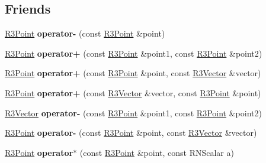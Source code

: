 \subsection*{Friends}
\begin{DoxyCompactItemize}
\item 
\hyperlink{class_r3_point}{R3\+Point} {\bfseries operator-\/} (const \hyperlink{class_r3_point}{R3\+Point} \&point)\hypertarget{class_r3_point_a2b9b2cd86f7ab7e0df974d89ad0c0f15}{}\label{class_r3_point_a2b9b2cd86f7ab7e0df974d89ad0c0f15}

\item 
\hyperlink{class_r3_point}{R3\+Point} {\bfseries operator+} (const \hyperlink{class_r3_point}{R3\+Point} \&point1, const \hyperlink{class_r3_point}{R3\+Point} \&point2)\hypertarget{class_r3_point_aca79abb3dc284337df28b0a0b47b4d4a}{}\label{class_r3_point_aca79abb3dc284337df28b0a0b47b4d4a}

\item 
\hyperlink{class_r3_point}{R3\+Point} {\bfseries operator+} (const \hyperlink{class_r3_point}{R3\+Point} \&point, const \hyperlink{class_r3_vector}{R3\+Vector} \&vector)\hypertarget{class_r3_point_a395bf315cbac0a603151eb78eee9b2fa}{}\label{class_r3_point_a395bf315cbac0a603151eb78eee9b2fa}

\item 
\hyperlink{class_r3_point}{R3\+Point} {\bfseries operator+} (const \hyperlink{class_r3_vector}{R3\+Vector} \&vector, const \hyperlink{class_r3_point}{R3\+Point} \&point)\hypertarget{class_r3_point_a849673eaf1e2a90cae0afdc9d3d0e0b4}{}\label{class_r3_point_a849673eaf1e2a90cae0afdc9d3d0e0b4}

\item 
\hyperlink{class_r3_vector}{R3\+Vector} {\bfseries operator-\/} (const \hyperlink{class_r3_point}{R3\+Point} \&point1, const \hyperlink{class_r3_point}{R3\+Point} \&point2)\hypertarget{class_r3_point_a5c534d1f3962c2e70d7be72b36d5ea03}{}\label{class_r3_point_a5c534d1f3962c2e70d7be72b36d5ea03}

\item 
\hyperlink{class_r3_point}{R3\+Point} {\bfseries operator-\/} (const \hyperlink{class_r3_point}{R3\+Point} \&point, const \hyperlink{class_r3_vector}{R3\+Vector} \&vector)\hypertarget{class_r3_point_a10c15f23f6ad0fb37ba8e8a0ed95b139}{}\label{class_r3_point_a10c15f23f6ad0fb37ba8e8a0ed95b139}

\item 
\hyperlink{class_r3_point}{R3\+Point} {\bfseries operator$\ast$} (const \hyperlink{class_r3_point}{R3\+Point} \&point, const R\+N\+Scalar a)\hypertarget{class_r3_point_add54f903121b620f7aef312a92ef080f}{}\label{class_r3_point_add54f903121b620f7aef312a92ef080f}


\end{DoxyCompactItemize}
